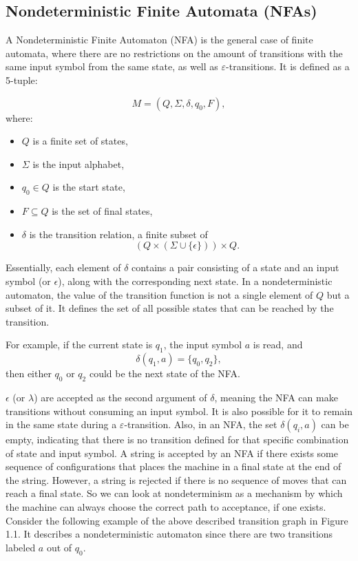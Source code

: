 \subsection{Nondeterministic Finite Automata (NFAs)}

A Nondeterministic Finite Automaton (NFA) is the general case of finite automata, where there are no restrictions on the amount of transitions with
the same input symbol from the same state, as well as \(\varepsilon\)-transitions. It is defined as a 5-tuple:

\[
M = (Q, \Sigma, \delta, q_0, F),
\]
where:
\begin{itemize}
    \item \(Q\) is a finite set of states,
    \item \(\Sigma\) is the input alphabet,
    \item \(q_0 \in Q\) is the start state,
    \item \(F \subseteq Q\) is the set of final states,
    \item \(\delta\) is the transition relation, a finite subset of
    \[
    (Q \times (\Sigma \cup \{\epsilon\})) \times Q.
    \]
\end{itemize}
Essentially, each element of \(\delta\) contains a pair consisting of a state and an input symbol (or \(\epsilon\)), along with the corresponding next state.
In a nondeterministic automaton, the value of the transition function is not a single element of \(Q\) but a subset of it. 
It  defines the set of all possible states that can be reached by the transition. 

For example, if the current state is \(q_1\), the input symbol \(a\) is read, and
\[
\delta(q_1, a) = \{q_0, q_2\},
\]
then either \(q_0\) or \(q_2\) could be the next state of the NFA. 

\(\epsilon\) (or \(\lambda\)) are accepted as the second argument of \(\delta\), 
meaning the NFA can make transitions without consuming an input symbol. 
It is also possible for it to remain in the same state during a \(\varepsilon\)-transition.
Also, in an NFA, the set \(\delta(q_i, a)\) can be empty, indicating that there is no transition defined for that specific combination of state and input symbol.
A string is accepted by an NFA if there exists some sequence of configurations that places the machine in a final state at the end of the string. 
However, a string is rejected if there is no sequence of moves that can reach a final state. So we can look at nondeterminism as a mechanism 
by which the machine can always choose the correct path to acceptance, if one exists.
Consider the following example of the above described transition graph in Figure 1.1. It describes a nondeterministic automaton since there are
two transitions labeled \(a\) out of \(q_0\).

